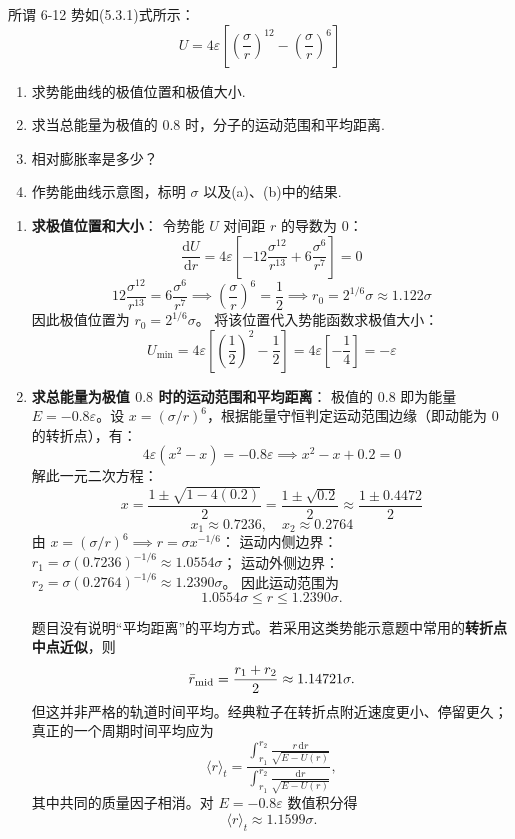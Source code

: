 \begin{exercise}\label{ex:10.6}
所谓 6-12 势如(5.3.1)式所示：
$$U = 4\varepsilon \left[ \left(\frac{\sigma}{r}\right)^{12} - \left(\frac{\sigma}{r}\right)^6 \right]$$
\begin{enumerate}
  \item[(a)] 求势能曲线的极值位置和极值大小. 
  \item[(b)] 求当总能量为极值的 $0.8$ 时，分子的运动范围和平均距离. 
  \item[(c)] 相对膨胀率是多少？
  \item[(d)] 作势能曲线示意图，标明 $\sigma$ 以及(a)、(b)中的结果.
\end{enumerate}
\end{exercise}
\begin{solution}
\begin{enumerate}
    \item[(a)] \textbf{求极值位置和大小}：
    令势能 $U$ 对间距 $r$ 的导数为 $0$：
    $$ \frac{\mathrm{d}U}{\mathrm{d}r} = 4\varepsilon \left[ -12 \frac{\sigma^{12}}{r^{13}} + 6 \frac{\sigma^6}{r^7} \right] = 0 $$
    $$ 12 \frac{\sigma^{12}}{r^{13}} = 6 \frac{\sigma^6}{r^7} \implies \left( \frac{\sigma}{r} \right)^6 = \frac{1}{2} \implies r_0 = 2^{1/6} \sigma \approx 1.122 \sigma $$
    因此极值位置为 $r_0 = 2^{1/6} \sigma$。
    将该位置代入势能函数求极值大小：
    $$ U_{\min} = 4\varepsilon \left[ \left(\frac{1}{2}\right)^2 - \frac{1}{2} \right] = 4\varepsilon \left[ -\frac{1}{4} \right] = -\varepsilon $$

    \item[(b)] \textbf{求总能量为极值 $0.8$ 时的运动范围和平均距离}：
    极值的 $0.8$ 即为能量 $E = -0.8\varepsilon$。设 $x = (\sigma/r)^6$，根据能量守恒判定运动范围边缘（即动能为 $0$ 的转折点），有：
    $$ 4\varepsilon (x^2 - x) = -0.8\varepsilon \implies x^2 - x + 0.2 = 0 $$
    解此一元二次方程：
    $$ x = \frac{1 \pm \sqrt{1 - 4(0.2)}}{2} = \frac{1 \pm \sqrt{0.2}}{2} \approx \frac{1 \pm 0.4472}{2} $$
    $$ x_1 \approx 0.7236, \quad x_2 \approx 0.2764 $$
    由 $x = (\sigma/r)^6 \implies r = \sigma x^{-1/6}$：
    运动内侧边界：$r_1 = \sigma (0.7236)^{-1/6} \approx 1.0554\sigma$；
    运动外侧边界：$r_2 = \sigma (0.2764)^{-1/6} \approx 1.2390\sigma$。
    因此运动范围为
    $$ \boxed{1.0554\sigma\le r\le1.2390\sigma}. $$

    题目没有说明“平均距离”的平均方式。若采用这类势能示意题中常用的\textbf{转折点中点近似}，则
    $$ \bar r_{\rm mid}=\frac{r_1+r_2}{2}\approx1.14721\sigma. $$
    但这并非严格的轨道时间平均。经典粒子在转折点附近速度更小、停留更久；真正的一个周期时间平均应为
    $$
    \langle r\rangle_t=
    \frac{\displaystyle\int_{r_1}^{r_2}
      \frac{r\,\mathrm{d}r}{\sqrt{E-U(r)}}}
    {\displaystyle\int_{r_1}^{r_2}
      \frac{\mathrm{d}r}{\sqrt{E-U(r)}}},
    $$
    其中共同的质量因子相消。对 $E=-0.8\varepsilon$ 数值积分得
    $$ \boxed{\langle r\rangle_t\approx1.1599\sigma}. $$


\end{enumerate}
\end{solution}

